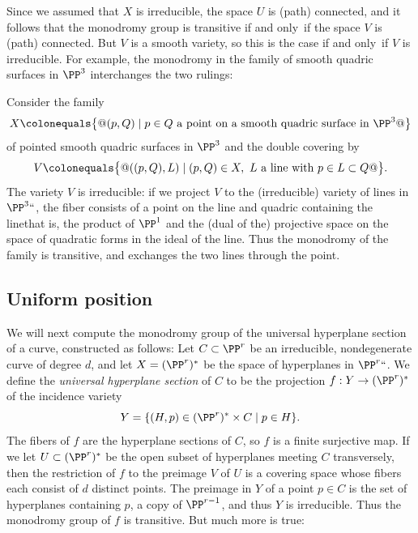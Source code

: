 Since we assumed that $X$ is irreducible, the space $U$ is (path)
connected, and it follows that the monodromy group is transitive if and
%
only~if the space $V$ is (path) connected. But $V$ is a smooth
variety, so this is the case if and only~if $V$ is irreducible. For
example, the monodromy in the family
of
smooth quadric surfaces in $\PP^3$
interchanges the two
rulings:
%
%

\begin{example}\label{monodromy of rulings}
Consider the family
$$
X \colonequals  \big\{@(p,Q) \mid p\in Q\hbox{ a point on a smooth quadric
surface in $\PP^3$}@\big\}
$$
of pointed smooth quadric surfaces in $\PP^3$ and the double covering by
$$
V\colonequals  \big\{@((p,Q), L)\mid (p,Q)\in X,\ L \hbox{ a line with $p
\in L\subset Q$}@\big\}.
$$
The variety $V$ is irreducible: if we project $V$ to the (irreducible)
variety of lines in $\PP^3` `$,
the fiber consists of a point on the line and quadric containing the
line\emdash that is, the product
of $\PP^1$ and the (dual of the) projective space
on the space of quadratic forms in the ideal of the line. Thus the
monodromy of the family
is transitive, and exchanges the two lines through the point.
\end{example}

\subsection*{Uniform position}


We will next compute the monodromy group of the  universal hyperplane
section of a curve, constructed as follows:
Let $C \subset \PP^r$ be an irreducible, nondegenerate curve of degree
$d$, and let $X = (\PP^r)^*$ be the space of hyperplanes in $\PP^r``$.
We define the \emph{universal hyperplane section} of $C$ to be the
%
projection  $f: Y\to (\PP^r)^*$ of the incidence variety
$$
Y = \{ (H, p) \in (\PP^r)^* \times C \mid p \in H \}.
$$
The fibers of $f$ are the hyperplane
sections of $C$, so $f$ is a finite surjective map. If we let $U\subset
(\PP^r)^*$ be the open subset of hyperplanes
meeting $C$ transversely, then the restriction of $f$ to the preimage $V$
of $U$ is a covering space
whose fibers each consist of $d$ distinct points. The preimage in $Y$
of a point $p\in C$ is the set of hyperplanes containing
$p$, a copy of $\PP^{r-1}$, and thus $Y$ is irreducible. Thus the
monodromy group of $f$ is transitive. But much more is true:

